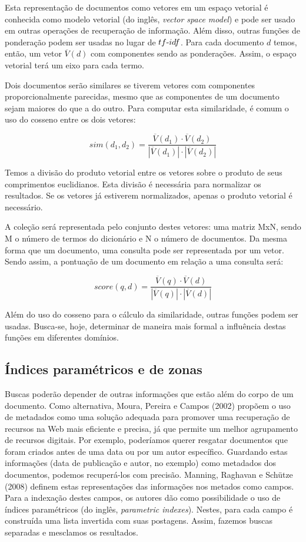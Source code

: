 Esta representação de documentos como vetores em um espaço vetorial é conhecida como modelo vetorial (do inglês, \emph{vector space model}) e pode ser usado em outras operações de recuperação de informação. Além disso, outras funções de ponderação podem ser usadas no lugar de $tf\textnormal{-}idf$. Para cada documento $d$ temos, então, um vetor $\overline{V}(d)$ com componentes sendo as ponderações. Assim, o espaço vetorial terá um eixo para cada termo.

Dois documentos serão similares se tiverem vetores com componentes proporcionalmente parecidas, mesmo que as componentes de um documento sejam maiores do que a do outro. Para computar esta similaridade, é comum o uso do cosseno entre os dois vetores:

$$sim(d_{1},d_{2}) = \frac{\overline{V}(d_{1})\cdot \overline{V}(d_{2})}{|\overline{V}(d_{1})|\cdot|\overline{V}(d_{2})|}$$

Temos a divisão do produto vetorial entre os vetores sobre o produto de seus comprimentos euclidianos. Esta divisão é necessária para normalizar os resultados. Se os vetores já estiverem normalizados, apenas o produto vetorial é necessário.

A coleção será representada pelo conjunto destes vetores: uma matriz MxN, sendo M o número de termos do dicionário e N o número de documentos. Da mesma forma que um documento, uma consulta pode ser representada por um vetor. Sendo assim, a pontuação de um documento em relação a uma consulta será:

$$score(q,d) = \frac{\overline{V}(q) \cdot \overline{V}(d)}{|\overline{V}(q)|\cdot|\overline{V}(d)|}$$

Além do uso do cosseno para o cálculo da similaridade, outras funções podem ser usadas. Busca-se, hoje, determinar de maneira mais formal a influência destas funções em diferentes domínios.

\subsection{Índices paramétricos e de zonas}

Buscas poderão depender de outras informações que estão além do corpo de um documento. Como alternativa, Moura, Pereira e Campos (2002) propõem o uso de metadados como uma solução adequada para promover uma recuperação de recursos na Web mais eficiente e precisa, já que permite um melhor agrupamento de recursos digitais. Por exemplo, poderíamos querer resgatar documentos que foram criados antes de uma data ou por um autor específico. Guardando estas informações (data de publicação e autor, no exemplo) como metadados dos documentos, podemos recuperá-los com precisão. Manning, Raghavan e Schütze (2008) definem estas representações das informações nos metados como campos. Para a indexação destes campos, os autores dão como possibilidade o uso de índices paramétricos (do inglês, \emph{parametric indexes}). Nestes, para cada campo é construída uma lista invertida com suas postagens. Assim, fazemos buscas separadas e mesclamos os resultados.

